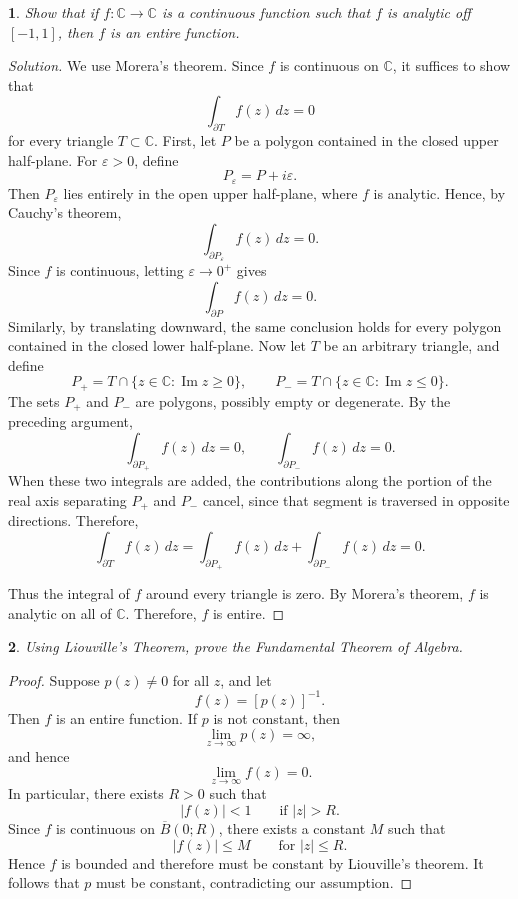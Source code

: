 \documentclass[12pt, a4paper]{report}
\theoremstyle{spaced}
\newtheorem{exercise}{}
\begin{document}
\begin{exercise}
	Show that if \(f:\mathbb{C}\to\mathbb{C}\) is a continuous function such that
	\(f\) is analytic off \([-1,1]\), then \(f\) is an entire function.
\end{exercise}
\begin{proof}[Solution]
	We use Morera's theorem. Since \(f\) is continuous on \(\mathbb{C}\), it suffices to show that
	\[
		\int_{\partial T} f(z)\,dz=0
	\]
	for every triangle \(T\subset\mathbb{C}\).
	First, let \(P\) be a polygon contained in the closed upper half-plane. For
	\(\varepsilon>0\), define
	\[
		P_{\varepsilon}=P+i\varepsilon.
	\]
	Then \(P_{\varepsilon}\) lies entirely in the open upper half-plane, where \(f\)
	is analytic. Hence, by Cauchy's theorem,
	\[
		\int_{\partial P_{\varepsilon}} f(z)\,dz=0.
	\]
	Since \(f\) is continuous, letting \(\varepsilon\to 0^{+}\) gives
	\[
		\int_{\partial P} f(z)\,dz=0.
	\]
	Similarly, by translating downward, the same conclusion holds for every
	polygon contained in the closed lower half-plane.
	Now let \(T\) be an arbitrary triangle, and define
	\[
		P_{+}=T\cap\{z\in\mathbb{C}:\operatorname{Im}z\geq 0\},
		\qquad
		P_{-}=T\cap\{z\in\mathbb{C}:\operatorname{Im}z\leq 0\}.
	\]
	The sets \(P_{+}\) and \(P_{-}\) are polygons, possibly empty or degenerate.
	By the preceding argument,
	\[
		\int_{\partial P_{+}} f(z)\,dz=0,
		\qquad
		\int_{\partial P_{-}} f(z)\,dz=0.
	\]
	When these two integrals are added, the contributions along the portion of the
	real axis separating \(P_{+}\) and \(P_{-}\) cancel, since that segment is
	traversed in opposite directions. Therefore,
	\[
		\int_{\partial T} f(z)\,dz
		=
		\int_{\partial P_{+}} f(z)\,dz
		+
		\int_{\partial P_{-}} f(z)\,dz
		=0.
	\]

	Thus the integral of \(f\) around every triangle is zero. By Morera's theorem,
	\(f\) is analytic on all of \(\mathbb{C}\). Therefore, \(f\) is entire.
\end{proof}

\begin{exercise}
	Using Liouville's Theorem, prove the Fundamental Theorem of Algebra.
\end{exercise}

\begin{proof}
	Suppose \(p(z)\neq 0\) for all \(z\), and let
	\[
		f(z)=[p(z)]^{-1}.
	\]
	Then \(f\) is an entire function. If \(p\) is not constant, then
	\[
		\lim_{z\to\infty}p(z)=\infty,
	\]
	and hence
	\[
		\lim_{z\to\infty}f(z)=0.
	\]
	In particular, there exists \(R>0\) such that
	\[
		|f(z)|<1 \qquad \text{if } |z|>R.
	\]
	Since \(f\) is continuous on \(\overline{B}(0;R)\), there exists a constant
	\(M\) such that
	\[
		|f(z)|\leq M \qquad \text{for } |z|\leq R.
	\]
	Hence \(f\) is bounded and therefore must be constant by Liouville's theorem.
	It follows that \(p\) must be constant, contradicting our assumption.
\end{proof}
\end{document}
